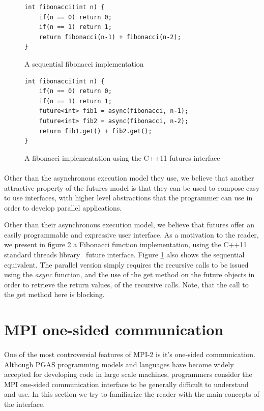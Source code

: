 \begin{figure}[!ht]
\begin{lstlisting}
int	fibonacci(int n) {
	if(n == 0) return 0;
	if(n == 1) return 1;
	return fibonacci(n-1) + fibonacci(n-2);
}
\end{lstlisting}
\caption{A sequential fibonacci implementation}
\label{lst:fib_seq}
\end{figure}

\begin{figure}[!ht]
\begin{lstlisting}
int	fibonacci(int n) {
	if(n == 0) return 0;
	if(n == 1) return 1;
	future<int> fib1 = async(fibonacci, n-1);
	future<int> fib2 = async(fibonacci, n-2);
	return fib1.get() + fib2.get();
}
\end{lstlisting}
\caption{A fibonacci implementation using the C++11 futures interface}
\label{lst:fib_futures}
\end{figure}

\paragraph{}
Other than the asynchronous execution model they use, we believe that another attractive property of the futures model 
is that they can be used to compose easy to use interfaces, with higher level abstractions that the programmer can use 
in order to develop parallel applications. 

Other than their asynchronous execution model, we believe that futures offer an easily programmable and expressive 
user interface.
As a motivation to the reader, we present in figure \ref{lst:fib_futures} a
Fibonacci function implementation, using the C++11 standard threads library~\cite{CPP:Threads} future interface.  Figure
\ref{lst:fib_seq} also shows the sequential equivalent.  The parallel version simply requires the recursive calls 
to be issued using the \emph{async} function, and the use of the get method on the future objects in order to retrieve
the return values, of the recursive calls.  Note, that the call to the get method here is blocking.  


\section{MPI one-sided communication}
\label{sect:mpi-one-sided}
\paragraph{}
One of the most controversial features of MPI-2 is it's one-sided communication.  Although PGAS programming
models and languages have become widely accepted for developing code in large scale machines, programmers
consider the MPI one-sided communication interface to be generally difficult to understand and use.  In this
section we try to familiarize the reader with the main concepts of the interface.  

